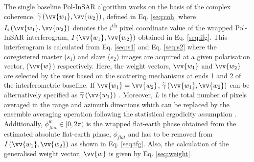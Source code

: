 \documentclass[12pt]{elsarticle}
\numberwithin{equation}{section}
\numberwithin{figure}{section}
\numberwithin{table}{section}
\begin{document}
The single baseline Pol-InSAR algorithm works on the basis of the complex coherence, $\widetilde{\gamma}\left(\vv{w_1}, \vv{w_2}\right)$, defined in Eq. \eqref{seq:coh} where $I_i\left(\vv{w_1}, \vv{w_2}\right)$ denotes the $i$\textsuperscript{th} pixel coordinate value of the wrapped Pol-InSAR interferogram, $I\left(\vv{w_1}, \vv{w_2}\right)$ obtained in Eq. \eqref{seq:ifg}. This interferogram is calculated from Eq. \eqref{seq:s1} and Eq. \eqref{seq:s2} where the coregistered master ($s_1$) and slave ($s_2$) images are acquired at a given polarisation vector, ($\vv{w}$) respectively. Here, the weight vectors, $\vv{w_1}$ and $\vv{w_2}$ are selected by the user based on the scattering mechanisms at ends 1 and 2 of the interferometric baseline. If $\vv{w_1} = \vv{w_2}$, $\widetilde{\gamma}\left(\vv{w_1}, \vv{w_2}\right)$ can be alternatively specified as $\widetilde{\gamma}\left(\vv{w_1}\right)$ \citep{Cloude2005, Cloude2010}. Moreover, $L$ is the total number of pixels averaged in the range and azimuth directions which can be replaced by the ensemble averaging operation following the statistical ergodicity assumption \citep{Hanssen2001, Hoen2000, Kugler2015, Kumar2017, Papathanassiou2001}. Additionally, $\phi_{flat}^w \in [0, 2\pi)$ is the wrapped flat-earth phase obtained from the estimated absolute flat-earth phase, $\phi_{flat}$ and has to be removed from $I\left(\vv{w_1}, \vv{w_2}\right)$ as shown in Eq. \eqref{seq:ifg}. Also, the calculation of the generalised weight vector, $\vv{w}$ is given by Eq. \eqref{seq:weight}.
\end{document}

